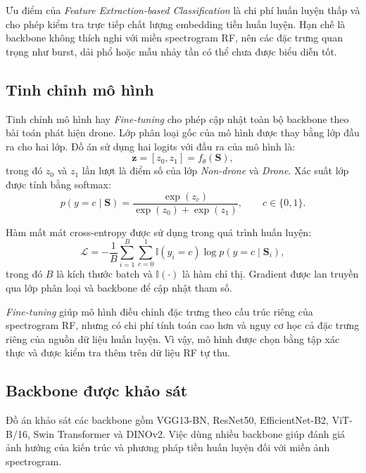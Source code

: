 \documentclass[../DoAn.tex]{subfiles}
\begin{document}
Ưu điểm của \textit{Feature Extraction-based Classification} là chi phí huấn luyện thấp và cho phép kiểm tra trực tiếp chất lượng embedding tiền huấn luyện. Hạn chế là backbone không thích nghi với miền spectrogram RF, nên các đặc trưng quan trọng như burst, dải phổ hoặc mẫu nhảy tần có thể chưa được biểu diễn tốt.

\subsection{Tinh chỉnh mô hình}
Tinh chỉnh mô hình hay \textit{Fine-tuning} cho phép cập nhật toàn bộ backbone theo bài toán phát hiện drone. Lớp phân loại gốc của mô hình được thay bằng lớp đầu ra cho hai lớp. Đồ án sử dụng hai logits với đầu ra của mô hình là:
\begin{equation}
    \mathbf{z}
    =
    [z_0,z_1]
    =
    f_{\theta}(\mathbf{S}),
\end{equation}
trong đó $z_0$ và $z_1$ lần lượt là điểm số của lớp \textit{Non-drone} và \textit{Drone}. Xác suất lớp được tính bằng softmax:
\begin{equation}
    p(y=c\mid\mathbf{S})
    =
    \frac{\exp(z_c)}
    {\exp(z_0)+\exp(z_1)},
    \qquad c\in\{0,1\}.
\end{equation}

Hàm mất mát cross-entropy được sử dụng trong quá trình huấn luyện:
\begin{equation}
    \mathcal{L}
    =
    -\frac{1}{B}
    \sum_{i=1}^{B}
    \sum_{c=0}^{1}
    \mathbb{I}(y_i=c)
    \log p(y=c\mid\mathbf{S}_i),
\end{equation}
trong đó $B$ là kích thước batch và $\mathbb{I}(\cdot)$ là hàm chỉ thị. Gradient được lan truyền qua lớp phân loại và backbone để cập nhật tham số.

\textit{Fine-tuning} giúp mô hình điều chỉnh đặc trưng theo cấu trúc riêng của spectrogram RF, nhưng có chi phí tính toán cao hơn và nguy cơ học cả đặc trưng riêng của nguồn dữ liệu huấn luyện. Vì vậy, mô hình được chọn bằng tập xác thực và được kiểm tra thêm trên dữ liệu RF tự thu.

\subsection{Backbone được khảo sát}

Đồ án khảo sát các backbone gồm VGG13-BN, ResNet50, EfficientNet-B2, ViT-B/16, Swin Transformer và DINOv2. Việc dùng nhiều backbone giúp đánh giá ảnh hưởng của kiến trúc và phương pháp tiền huấn luyện đối với miền ảnh spectrogram.
\end{document}
